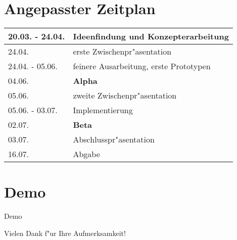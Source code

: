 \documentclass[landscape,compress,table]{beamer}
\begin{document}
\section{Angepasster Zeitplan}
\begin{frame}
	\begin{tabular}{|l|l|}
		\hline
		20.03. - 24.04. & Ideenfindung und Konzepterarbeitung\\
		\hline
		24.04. & erste Zwischenpr"asentation\\
		\hline
		24.04. - 05.06. & feinere Ausarbeitung, erste Prototypen\\
		\hline
		04.06. & \textbf{Alpha}\\
		\hline
		05.06. & zweite Zwischenpr"asentation\\
		\hline
		05.06. - 03.07. & Implementierung\\
		\hline
		02.07. & \textbf{Beta}\\
		\hline
		03.07. & Abschlusspr"asentation\\
		\hline
		16.07. & Abgabe\\
		\hline
	\end{tabular}
\end{frame}

\section{Demo}
\begin{frame}
	\begin{center}
		Demo
	\end{center}
\end{frame}

\begin{frame}
	\begin{center}
		Vielen Dank f"ur Ihre Aufmerksamkeit!
	\end{center}
\end{frame}
\end{document}
